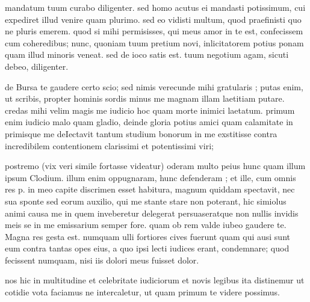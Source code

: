 


 mandatum tuum curabo diligenter. sed homo acutus ei mandasti potissimum, cui expediret illud venire quam plurimo. sed eo vidisti multum, quod praefinisti quo ne pluris emerem. quod si mihi permisisses, qui meus amor in te est, confecissem cum coheredibus; nunc, quoniam tuum pretium novi, inlicitatorem potius ponam quam illud minoris veneat. sed de ioco satis est. tuum negotium agam, sicuti debeo, diligenter.

 de Bursa te gaudere certo scio; sed nimis verecunde mihi gratularis ; putas enim, ut scribis, propter hominis sordis minus me magnam illam laetitiam putare. credas mihi velim magis me iudicio hoc quam morte inimici laetatum. primum enim iudicio malo quam gladio, deinde gloria potius amici quam calamitate in primisque me deIectavit tantum studium bonorum in me exstitisse contra incredibilem contentionem clarissimi et potentissimi viri;

 postremo (vix veri simile fortasse videatur) oderam multo peius hunc quam illum ipsum Clodium. illum enim oppugnaram, hunc defenderam ; et ille, cum omnis res p. in meo capite discrimen esset habitura, magnum quiddam spectavit, nec sua sponte sed eorum auxilio, qui me stante stare non poterant, hic simiolus animi causa me in quem inveberetur delegerat persuaseratque non nullis invidis meis se in me emissarium semper fore. quam ob rem valde iubeo gaudere te. Magna res gesta est. numquam ulli fortiores cives fuerunt quam qui ausi sunt eum contra tantas opes eius, a quo ipsi lecti iudices erant, condemnare; quod fecissent numquam, nisi iis dolori meus fuisset dolor.

 nos hic in multitudine et celebritate iudiciorum et novis legibus ita distinemur ut cotidie vota faciamus ne intercaletur, ut quam primum te videre possimus.
